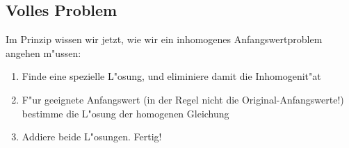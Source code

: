 \subsection{Volles Problem}
Im Prinzip wissen wir jetzt, wie wir ein inhomogenes Anfangswertproblem angehen m"ussen:  
\begin{enumerate}
\item Finde eine spezielle L"osung, und eliminiere damit die Inhomogenit"at
\item F"ur geeignete Anfangswert (in der Regel nicht die Original-Anfangswerte!) 
bestimme die L"osung der homogenen Gleichung
\item Addiere beide L"osungen. Fertig!
\end{enumerate}

